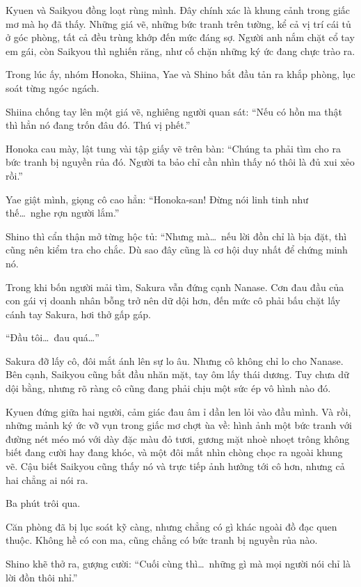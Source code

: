 \documentclass[../main.tex]{subfiles}
\begin{document}
Kyuen và Saikyou đồng loạt rùng mình. Đây chính xác là khung cảnh trong giấc mơ mà họ đã thấy. Những giá vẽ, những bức tranh trên tường, kể cả vị trí cái tủ ở góc phòng, tất cả đều trùng khớp đến mức đáng sợ. Người anh nắm chặt cổ tay em gái, còn Saikyou thì nghiến răng, như cố chặn những ký ức đang chực trào ra.

Trong lúc ấy, nhóm Honoka, Shiina, Yae và Shino bắt đầu tản ra khắp phòng, lục soát từng ngóc ngách.

Shiina chống tay lên một giá vẽ, nghiêng người quan sát: ``Nếu có hồn ma thật thì hẳn nó đang trốn đâu đó. Thú vị phết.''

Honoka cau mày, lật tung vài tập giấy vẽ trên bàn: ``Chúng ta phải tìm cho ra bức tranh bị nguyền rủa đó. Người ta bảo chỉ cần nhìn thấy nó thôi là đủ xui xẻo rồi.''

Yae giật mình, giọng cô cao hẳn: ``Honoka-san! Đừng nói linh tinh như thế\dots\ nghe rợn người lắm.''

Shino thì cẩn thận mở từng hộc tủ: ``Nhưng mà\dots\ nếu lời đồn chỉ là bịa đặt, thì cũng nên kiểm tra cho chắc. Dù sao đây cũng là cơ hội duy nhất để chứng minh nó.

Trong khi bốn người mải tìm, Sakura vẫn đứng cạnh Nanase. Cơn đau đầu của con gái vị doanh nhân bỗng trở nên dữ dội hơn, đến mức cô phải bấu chặt lấy cánh tay Sakura, hơi thở gấp gáp.

``Đầu tôi\dots\ đau quá\dots''

Sakura đỡ lấy cô, đôi mắt ánh lên sự lo âu. Nhưng cô không chỉ lo cho Nanase. Bên cạnh, Saikyou cũng bắt đầu nhăn mặt, tay ôm lấy thái dương. Tuy chưa dữ dội bằng, nhưng rõ ràng cô cũng đang phải chịu một sức ép vô hình nào đó.

Kyuen đứng giữa hai người, cảm giác đau âm ỉ dần len lỏi vào đầu mình. Và rồi, những mảnh ký ức vỡ vụn trong giấc mơ chợt ùa về: hình ảnh một bức tranh với đường nét méo mó với dày đặc màu đỏ tươi, gương mặt nhoè nhoẹt trông không biết đang cười hay đang khóc, và một đôi mắt nhìn chòng chọc ra ngoài khung vẽ. Cậu biết Saikyou cũng thấy nó và trực tiếp ảnh hưởng tới cô hơn, nhưng cả hai chẳng ai nói ra.

\ct

Ba phút trôi qua.

Căn phòng đã bị lục soát kỹ càng, nhưng chẳng có gì khác ngoài đồ đạc quen thuộc. Không hề có con ma, cũng chẳng có bức tranh bị nguyền rủa nào.

Shino khẽ thở ra, gượng cười: ``Cuối cùng thì\dots\ những gì mà mọi người nói chỉ là lời đồn thôi nhỉ.''
\end{document}
